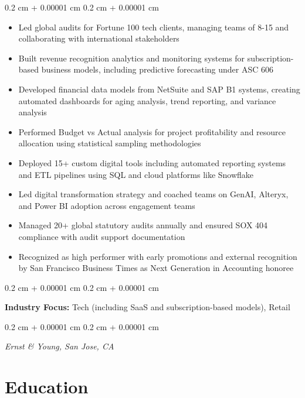 \documentclass[10pt, letterpaper]{article}
\newenvironment{highlights}{
    \begin{itemize}[
        topsep=0.10 cm,
        parsep=0.10 cm,
        partopsep=0pt,
        itemsep=0pt,
        leftmargin=0.4 cm + 10pt
    ]
}{
    \end{itemize}
} %
\newenvironment{onecolentry}{
    \begin{adjustwidth}{
        0.2 cm + 0.00001 cm
    }{
        0.2 cm + 0.00001 cm
    }
}{
    \end{adjustwidth}
} %
\begin{document}
        \vspace{0.10 cm}
        \begin{onecolentry}
            \begin{highlights}
                \item Led global audits for Fortune 100 tech clients, managing teams of 8-15 and collaborating with international stakeholders
                \item Built revenue recognition analytics and monitoring systems for subscription-based business models, including predictive forecasting under ASC 606
                \item Developed financial data models from NetSuite and SAP B1 systems, creating automated dashboards for aging analysis, trend reporting, and variance analysis
                \item Performed Budget vs Actual analysis for project profitability and resource allocation using statistical sampling methodologies
                \item Deployed 15+ custom digital tools including automated reporting systems and ETL pipelines using SQL and cloud platforms like Snowflake
                \item Led digital transformation strategy and coached teams on GenAI, Alteryx, and Power BI adoption across engagement teams
                \item Managed 20+ global statutory audits annually and ensured SOX 404 compliance with audit support documentation
                \item Recognized as high performer with early promotions and external recognition by San Francisco Business Times as Next Generation in Accounting honoree
            \end{highlights}
        \end{onecolentry}

        \vspace{0.10 cm}
        \begin{onecolentry}
            \textbf{Industry Focus:} Tech (including SaaS and subscription-based models), Retail
        \end{onecolentry}

        \vspace{0.10 cm}
        \begin{onecolentry}
            \textit{Ernst \& Young, San Jose, CA}
        \end{onecolentry}

    
    \section{Education}
\end{document}
